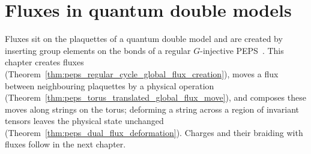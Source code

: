 \chapter{Fluxes in quantum double models}
\label{ch:peps_anyons_fluxes}

Fluxes sit on the plaquettes of a quantum double model and are created by
inserting group elements on the bonds of a regular $G$-injective
PEPS~\cite[Section~III.B]{Cirac2021Matrix}. This chapter creates fluxes
(Theorem~\ref{thm:peps_regular_cycle_global_flux_creation}), moves a flux
between neighbouring plaquettes by a physical operation
(Theorem~\ref{thm:peps_torus_translated_global_flux_move}), and composes these
moves along strings on the torus; deforming a string across a region of
invariant tensors leaves the physical state unchanged
(Theorem~\ref{thm:peps_dual_flux_deformation}). Charges and their
braiding with fluxes follow in the next chapter.


